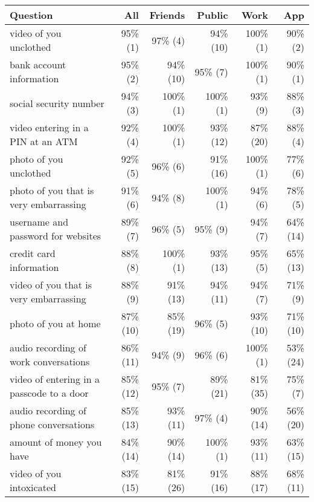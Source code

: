 

\begin{table*}[t]
\begin{center}
\small
\begin{tabular}{| l | r | r | r | r | r |}
\hline
Question & All & Friends & Public & Work& App \\
\hline
video of you unclothed & 95\% (1) & 97\% (4) & 94\% (10) & 100\% (1) & 90\% (2) \\ 
bank account information & 95\% (2) & 94\% (10) & 95\% (7) & 100\% (1) & 90\% (1) \\ 
social security number & 94\% (3) & 100\% (1) & 100\% (1) & 93\% (9) & 88\% (3) \\ 
video entering in a PIN at an ATM & 92\% (4) & 100\% (1) & 93\% (12) & 87\% (20) & 88\% (4) \\ 
photo of you unclothed & 92\% (5) & 96\% (6) & 91\% (16) & 100\% (1) & 77\% (6) \\ 
photo of you that is very embarrassing & 91\% (6) & 94\% (8) & 100\% (1) & 94\% (6) & 78\% (5) \\ 
username and password for websites & 89\% (7) & 96\% (5) & 95\% (9) & 94\% (7) & 64\% (14) \\ 
credit card information & 88\% (8) & 100\% (1) & 93\% (13) & 95\% (5) & 65\% (13) \\ 
video of you that is very embarrassing & 88\% (9) & 91\% (13) & 94\% (11) & 94\% (7) & 71\% (9) \\ 
photo of you at home & 87\% (10) & 85\% (19) & 96\% (5) & 93\% (10) & 71\% (10) \\ 
audio recording of work conversations & 86\% (11) & 94\% (9) & 96\% (6) & 100\% (1) & 53\% (24) \\ 
video of entering in a passcode to a door & 85\% (12) & 95\% (7) & 89\% (21) & 81\% (35) & 75\% (7) \\ 
audio recording of phone conversations & 85\% (13) & 93\% (11) & 97\% (4) & 90\% (14) & 56\% (20) \\ 
amount of money you have & 84\% (14) & 90\% (14) & 100\% (1) & 93\% (11) & 63\% (15) \\ 
video of you intoxicated & 83\% (15) & 81\% (26) & 91\% (16) & 88\% (17) & 68\% (11) \\ 

\end{tabular}
\end{center}
\end{table*}
